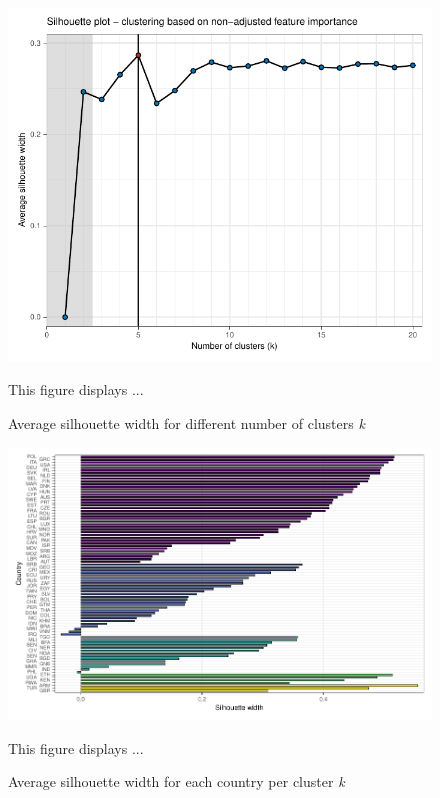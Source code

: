 \documentclass[12pt, a4paper]{article}
\newenvironment{subcaption}
{\strut
\vspace{-5pt}
\begin{minipage}[b]{0.9\textwidth}
  \hspace*{-\parindent}
  \footnotesize}
 {\end{minipage}}
\begin{document}

 \begin{figure}[ht!]
   \centering
   \caption{Average silhouette width for different number of clusters \textit{k}} \label{fig:G1_silhouette}
   \includegraphics{Figures_Appendix/Figure_Silhouette_1}
   \begin{subcaption}
     This figure displays ...
   \end{subcaption}
 \end{figure}

 \clearpage

 \begin{figure}[ht!]
   \centering
   \caption{Average silhouette width for each country per cluster \textit{k}} \label{fig:G2_silhouette}
   \includegraphics{Figures_Appendix/Figure_Silhouette_Clusters_1}
   \begin{subcaption}
     This figure displays ...
   \end{subcaption}
 \end{figure}
\end{document}
